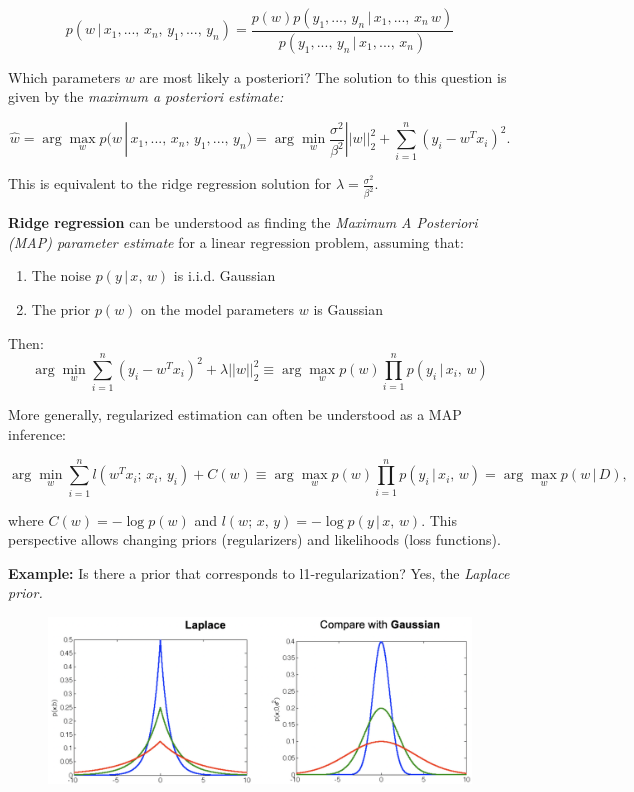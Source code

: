 \documentclass[a4paper]{extarticle}
\begin{document}
\[
    p(w \, | \, x_1,..., \, x_n, \, y_1,..., \, y_n) = \frac{p(w)p(y_1,..., \, y_n \, | \, x_1,..., \, x_n \, w)}{p(y_1,..., \, y_n \, | \, x_1,..., \, x_n)}
\]

Which parameters $w$ are most likely a posteriori? The solution to this question is given by the \textit{maximum a posteriori estimate:}

\[
    \hat{w} = \arg \max_w p(w \, | \, x_1,..., \, x_n, \, y_1,..., \, y_n) = \arg \min_w \frac{\sigma^2}{\beta^2}||w||_2^2 + \sum_{i = 1}^n (y_i - w^Tx_i)^2.
\]

This is equivalent to the ridge regression solution for $\lambda = \frac{\sigma^2}{\beta^2}$.

\textbf{Ridge regression} can be understood as finding the \textit{Maximum A Posteriori (MAP) parameter estimate} for a linear regression problem, assuming that:
\begin{enumerate}
    \item The noise $p(y \, | \, x, \, w)$ is i.i.d. Gaussian
    \item The prior $p(w)$ on the model parameters $w$ is Gaussian
\end{enumerate}

Then:
\[
    \arg \min_w \sum_{i = 1}^n (y_i - w^Tx_i)^2 + \lambda ||w||_2^2 \equiv \arg \max_w p(w) \prod_{i = 1}^n p(y_i \, | \, x_i, \, w)
\]

More generally, regularized estimation can often be understood as a MAP inference:

\[
    \arg \min_w \sum_{i = 1}^n l(w^Tx_i; \, x_i, \, y_i) + C(w) \equiv \arg \max_w p(w) \prod_{i = 1}^n p(y_i \, | \, x_i, \, w) = \arg \max_w p(w \, | \, D),
\]

where $C(w) = - \log p(w)$ and $l(w; \, x, \, y) = - \log p(y \, | \, x, \, w)$. This perspective allows changing priors (regularizers) and likelihoods (loss functions).

\textbf{Example:} Is there a prior that corresponds to l1-regularization? Yes, the \textit{Laplace prior.}

\begin{figure}[H]
    \includegraphics[width=15cm]{../images/IntroML_Fig10-5}
    \centering
\end{figure}
\end{document}
